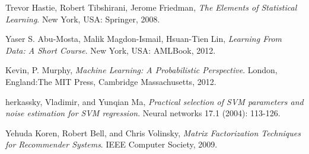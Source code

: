 \documentclass{article}
\begin{document}
\begin{spacing}{1}
\begin{large}
\begin{thebibliography}{9}
	Trevor Hastie, Robert Tibshirani, Jerome Friedman, \textit{The Elements of Statistical Learning}. New York, USA: Springer, 2008.

	Yaser S. Abu-Mosta, Malik Magdon-Ismail, Hsuan-Tien Lin, \textit{Learning From Data: A Short Course}. New York, USA: AMLBook, 2012.

	Kevin, P. Murphy, \textit{Machine Learning: A Probabilistic Perspective}. London, England:The MIT Press, Cambridge Massachusetts, 2012.

	herkassky, Vladimir, and Yunqian Ma, \textit{Practical selection of SVM parameters and noise estimation for SVM regression}. Neural networks 17.1 (2004): 113-126.

	Yehuda Koren, Robert Bell, and  Chris Volinsky,
	\textit{Matrix Factorization Techniques for Recommender Systems}. IEEE Computer Society, 2009.
\end{thebibliography}

\end{large}
\end{spacing}
\end{document}
